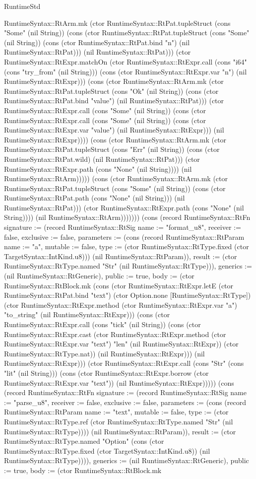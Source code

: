 \begin{lexlean}{RuntimeStd}
\begin{semanticmodule}
{RuntimeSyntax::RtArm.mk (ctor RuntimeSyntax::RtPat.tupleStruct (cons "Some" (nil String)) (cons (ctor RuntimeSyntax::RtPat.tupleStruct (cons "Some" (nil String)) (cons (ctor RuntimeSyntax::RtPat.bind "n") (nil RuntimeSyntax::RtPat))) (nil RuntimeSyntax::RtPat))) (ctor RuntimeSyntax::RtExpr.matchOn (ctor RuntimeSyntax::RtExpr.call (cons "i64" (cons "try_from" (nil String))) (cons (ctor RuntimeSyntax::RtExpr.var "n") (nil RuntimeSyntax::RtExpr))) (cons (ctor RuntimeSyntax::RtArm.mk (ctor RuntimeSyntax::RtPat.tupleStruct (cons "Ok" (nil String)) (cons (ctor RuntimeSyntax::RtPat.bind "value") (nil RuntimeSyntax::RtPat))) (ctor RuntimeSyntax::RtExpr.call (cons "Some" (nil String)) (cons (ctor RuntimeSyntax::RtExpr.call (cons "Some" (nil String)) (cons (ctor RuntimeSyntax::RtExpr.var "value") (nil RuntimeSyntax::RtExpr))) (nil RuntimeSyntax::RtExpr)))) (cons (ctor RuntimeSyntax::RtArm.mk (ctor RuntimeSyntax::RtPat.tupleStruct (cons "Err" (nil String)) (cons (ctor RuntimeSyntax::RtPat.wild) (nil RuntimeSyntax::RtPat))) (ctor RuntimeSyntax::RtExpr.path (cons "None" (nil String)))) (nil RuntimeSyntax::RtArm))))) (cons (ctor RuntimeSyntax::RtArm.mk (ctor RuntimeSyntax::RtPat.tupleStruct (cons "Some" (nil String)) (cons (ctor RuntimeSyntax::RtPat.path (cons "None" (nil String))) (nil RuntimeSyntax::RtPat))) (ctor RuntimeSyntax::RtExpr.path (cons "None" (nil String)))) (nil RuntimeSyntax::RtArm))))))}) (cons (record RuntimeSyntax::RtFn {signature := (record RuntimeSyntax::RtSig {name := "format_u8", receiver := false, exclusive := false, parameters := (cons (record RuntimeSyntax::RtParam {name := "a", mutable := false, type := (ctor RuntimeSyntax::RtType.fixed (ctor TargetSyntax::IntKind.u8))}) (nil RuntimeSyntax::RtParam)), result := (ctor RuntimeSyntax::RtType.named "Str" (nil RuntimeSyntax::RtType))}), generics := (nil RuntimeSyntax::RtGeneric), public := true, body := (ctor RuntimeSyntax::RtBlock.mk (cons (ctor RuntimeSyntax::RtExpr.letE (ctor RuntimeSyntax::RtPat.bind "text") (ctor Option.none [RuntimeSyntax::RtType]) (ctor RuntimeSyntax::RtExpr.method (ctor RuntimeSyntax::RtExpr.var "a") "to_string" (nil RuntimeSyntax::RtExpr))) (cons (ctor RuntimeSyntax::RtExpr.call (cons "tick" (nil String)) (cons (ctor RuntimeSyntax::RtExpr.cast (ctor RuntimeSyntax::RtExpr.method (ctor RuntimeSyntax::RtExpr.var "text") "len" (nil RuntimeSyntax::RtExpr)) (ctor RuntimeSyntax::RtType.nat)) (nil RuntimeSyntax::RtExpr))) (nil RuntimeSyntax::RtExpr))) (ctor RuntimeSyntax::RtExpr.call (cons "Str" (cons "lit" (nil String))) (cons (ctor RuntimeSyntax::RtExpr.borrow (ctor RuntimeSyntax::RtExpr.var "text")) (nil RuntimeSyntax::RtExpr))))}) (cons (record RuntimeSyntax::RtFn {signature := (record RuntimeSyntax::RtSig {name := "parse_u8", receiver := false, exclusive := false, parameters := (cons (record RuntimeSyntax::RtParam {name := "text", mutable := false, type := (ctor RuntimeSyntax::RtType.ref (ctor RuntimeSyntax::RtType.named "Str" (nil RuntimeSyntax::RtType)))}) (nil RuntimeSyntax::RtParam)), result := (ctor RuntimeSyntax::RtType.named "Option" (cons (ctor RuntimeSyntax::RtType.fixed (ctor TargetSyntax::IntKind.u8)) (nil RuntimeSyntax::RtType)))}), generics := (nil RuntimeSyntax::RtGeneric), public := true, body := (ctor RuntimeSyntax::RtBlock.mk }
\end{semanticmodule}
\end{lexlean}
